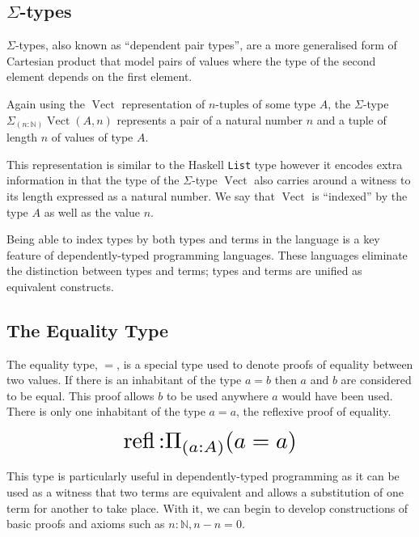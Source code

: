 \documentclass[a4paper, notitlepage]{report}
\begin{document}
\subsection{\texorpdfstring{$\Sigma$}{Sigma}-types}
\label{sec:orgb25a08f}
\(\Sigma\)-types, also known as ``dependent pair types'', are a more generalised
form of Cartesian product that model pairs of values where the type of the
second element depends on the first element.

Again using the \(\operatorname{Vect}\) representation of \(n\textrm{-tuples}\) of
some type \(A\), the \(\Sigma\)-type \(\Sigma_{(n \mathbin{:} {\mathbb N})}
\operatorname{Vect}(A,n)\) represents a pair of a natural number \(n\) and a tuple
of length \(n\) of values of type \(A\).

This representation is similar to the Haskell \texttt{List} type however it encodes extra
information in that the type of the \(\Sigma\)-type \(\operatorname{Vect}\) also
carries around a witness to its length expressed as a natural number. We say
that \(\operatorname{Vect}\) is ``indexed'' by the type \(A\) as well as the value
\(n\).

Being able to index types by both types and terms in the language is a key
feature of dependently-typed programming languages. These languages eliminate
the distinction between types and terms; types and terms are unified as
equivalent constructs.

\subsection{The Equality Type}
\label{sec:orgf846276}
The equality type, \(=\), is a special type used to denote proofs of equality
between two values. If there is an inhabitant of the type \(a \mathrel{=} b\) then
\(a\) and \(b\) are considered to be equal. This proof allows \(b\) to be used
anywhere \(a\) would have been used. There is only one inhabitant of the type \(a
\mathrel{=} a\), the reflexive proof of equality.

\[ \scalebox{2}{$\operatorname{refl} \mathbin{:} \Pi_{(a \mathbin{:} A)} (a
\mathrel{=} a)$} \]

This type is particularly useful in dependently-typed programming as it can be
used as a witness that two terms are equivalent and allows a substitution of one
term for another to take place. With it, we can begin to develop constructions
of basic proofs and axioms such as \(n \mathbin{:} {\mathbb N}, n \mathbin{-} n
\mathrel{=} 0\).
\end{document}
